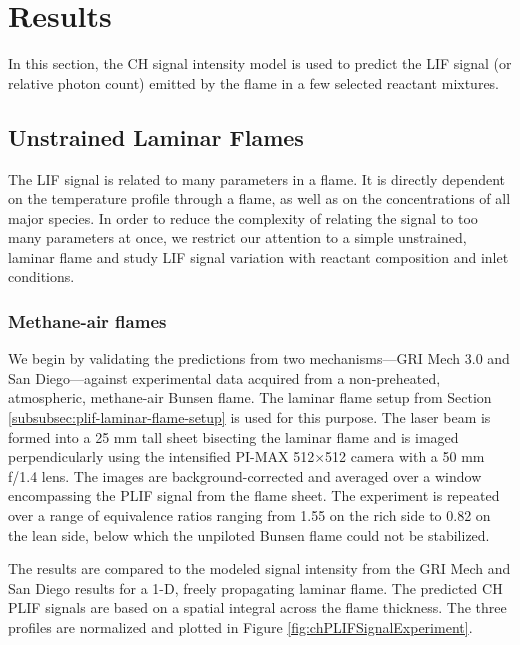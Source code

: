 \section{Results}

In this section, the CH signal intensity model is used to predict the LIF signal (or relative photon count) emitted by the flame in a few selected reactant mixtures.


\subsection{Unstrained Laminar Flames}

The LIF signal is related to many parameters in a flame.
It is directly dependent on the temperature profile through a flame, as well as on the concentrations of all major species.
In order to reduce the complexity of relating the signal to too many parameters at once, we restrict our attention to a simple unstrained, laminar flame and study LIF signal variation with reactant composition and inlet conditions.

\subsubsection{Methane-air flames}

We begin by validating the predictions from two mechanisms---GRI Mech 3.0 and San Diego---against experimental data acquired from a non-preheated, atmospheric, methane-air Bunsen flame.
The laminar flame setup from Section \ref{subsubsec:plif-laminar-flame-setup} is used for this purpose.
The laser beam is formed into a 25 mm tall sheet bisecting the laminar flame and is imaged perpendicularly using the intensified PI-MAX 512\(\times\)512 camera with a 50 mm f/1.4 lens.
The images are background-corrected and averaged over a window encompassing the PLIF signal from the flame sheet.
The experiment is repeated over a range of equivalence ratios ranging from 1.55 on the rich side to 0.82 on the lean side, below which the unpiloted Bunsen flame could not be stabilized.

The results are compared to the modeled signal intensity from the GRI Mech and San Diego results for a 1-D, freely propagating laminar flame. 
The predicted CH PLIF signals are based on a spatial integral across the flame thickness.
The three profiles are normalized and plotted in Figure \ref{fig:chPLIFSignalExperiment}.

